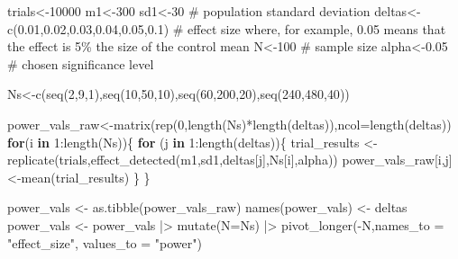 \documentclass[
  letterpaper,
  DIV=11,
  numbers=noendperiod]{scrreprt}
\newenvironment{Shaded}{\begin{snugshade}}{\end{snugshade}}
\newcommand{\AttributeTok}[1]{\textcolor[rgb]{0.40,0.45,0.13}{#1}}
\newcommand{\CommentTok}[1]{\textcolor[rgb]{0.37,0.37,0.37}{#1}}
\newcommand{\ControlFlowTok}[1]{\textcolor[rgb]{0.00,0.23,0.31}{\textbf{#1}}}
\newcommand{\DecValTok}[1]{\textcolor[rgb]{0.68,0.00,0.00}{#1}}
\newcommand{\FloatTok}[1]{\textcolor[rgb]{0.68,0.00,0.00}{#1}}
\newcommand{\FunctionTok}[1]{\textcolor[rgb]{0.28,0.35,0.67}{#1}}
\newcommand{\NormalTok}[1]{\textcolor[rgb]{0.00,0.23,0.31}{#1}}
\newcommand{\OtherTok}[1]{\textcolor[rgb]{0.00,0.23,0.31}{#1}}
\newcommand{\SpecialCharTok}[1]{\textcolor[rgb]{0.37,0.37,0.37}{#1}}
\newcommand{\StringTok}[1]{\textcolor[rgb]{0.13,0.47,0.30}{#1}}
\begin{document}
\begin{Shaded}
\begin{Highlighting}[]
\NormalTok{trials}\OtherTok{\textless{}{-}}\DecValTok{10000}
\NormalTok{m1}\OtherTok{\textless{}{-}}\DecValTok{300}
\NormalTok{sd1}\OtherTok{\textless{}{-}}\DecValTok{30} \CommentTok{\# population standard deviation}
\NormalTok{deltas}\OtherTok{\textless{}{-}}\FunctionTok{c}\NormalTok{(}\FloatTok{0.01}\NormalTok{,}\FloatTok{0.02}\NormalTok{,}\FloatTok{0.03}\NormalTok{,}\FloatTok{0.04}\NormalTok{,}\FloatTok{0.05}\NormalTok{,}\FloatTok{0.1}\NormalTok{) }\CommentTok{\# effect size where, for example, 0.05 means that the effect is 5\% the size of the control mean}
\NormalTok{N}\OtherTok{\textless{}{-}}\DecValTok{100} \CommentTok{\# sample size}
\NormalTok{alpha}\OtherTok{\textless{}{-}}\FloatTok{0.05} \CommentTok{\# chosen significance level}

\NormalTok{Ns}\OtherTok{\textless{}{-}}\FunctionTok{c}\NormalTok{(}\FunctionTok{seq}\NormalTok{(}\DecValTok{2}\NormalTok{,}\DecValTok{9}\NormalTok{,}\DecValTok{1}\NormalTok{),}\FunctionTok{seq}\NormalTok{(}\DecValTok{10}\NormalTok{,}\DecValTok{50}\NormalTok{,}\DecValTok{10}\NormalTok{),}\FunctionTok{seq}\NormalTok{(}\DecValTok{60}\NormalTok{,}\DecValTok{200}\NormalTok{,}\DecValTok{20}\NormalTok{),}\FunctionTok{seq}\NormalTok{(}\DecValTok{240}\NormalTok{,}\DecValTok{480}\NormalTok{,}\DecValTok{40}\NormalTok{))}

\NormalTok{power\_vals\_raw}\OtherTok{\textless{}{-}}\FunctionTok{matrix}\NormalTok{(}\FunctionTok{rep}\NormalTok{(}\DecValTok{0}\NormalTok{,}\FunctionTok{length}\NormalTok{(Ns)}\SpecialCharTok{*}\FunctionTok{length}\NormalTok{(deltas)),}\AttributeTok{ncol=}\FunctionTok{length}\NormalTok{(deltas))}
\ControlFlowTok{for}\NormalTok{(i }\ControlFlowTok{in} \DecValTok{1}\SpecialCharTok{:}\FunctionTok{length}\NormalTok{(Ns))\{}
  \ControlFlowTok{for}\NormalTok{ (j }\ControlFlowTok{in} \DecValTok{1}\SpecialCharTok{:}\FunctionTok{length}\NormalTok{(deltas))\{}
\NormalTok{    trial\_results }\OtherTok{\textless{}{-}} \FunctionTok{replicate}\NormalTok{(trials,}\FunctionTok{effect\_detected}\NormalTok{(m1,sd1,deltas[j],Ns[i],alpha))}
\NormalTok{    power\_vals\_raw[i,j]}\OtherTok{\textless{}{-}}\FunctionTok{mean}\NormalTok{(trial\_results)}
\NormalTok{  \}}
\NormalTok{\}}

\NormalTok{power\_vals }\OtherTok{\textless{}{-}} \FunctionTok{as.tibble}\NormalTok{(power\_vals\_raw)}
\FunctionTok{names}\NormalTok{(power\_vals) }\OtherTok{\textless{}{-}}\NormalTok{ deltas}
\NormalTok{power\_vals }\OtherTok{\textless{}{-}}\NormalTok{ power\_vals }\SpecialCharTok{|\textgreater{}}
  \FunctionTok{mutate}\NormalTok{(}\AttributeTok{N=}\NormalTok{Ns) }\SpecialCharTok{|\textgreater{}}
  \FunctionTok{pivot\_longer}\NormalTok{(}\SpecialCharTok{{-}}\NormalTok{N,}\AttributeTok{names\_to =} \StringTok{"effect\_size"}\NormalTok{, }\AttributeTok{values\_to =} \StringTok{"power"}\NormalTok{)}
\end{Highlighting}
\end{Shaded}
\end{document}

